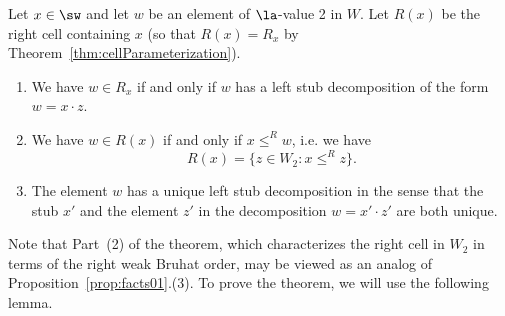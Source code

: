 \begin{thm}
    \label{thm:CellViaDecomp}
    Let $x\in \sw$ and let $w$ be an element of $\la$-value 2 in $W$. Let $R(x)$ be the right cell containing $x$
    \textup{(}so that $R(x)=R_x$ by Theorem~\ref{thm:cellParameterization}\textup{)}.
    \begin{enumerate}
        \item We have  $w\in R_x$ if and only if $w$ has a left stub decomposition of the form $w=x\cdot z$.
        \item We have $w\in R(x)$ if and only if $x\le^R w$, i.e. we have 
        \[
            R(x)=\{z\in W_2: x\le^R z\}.
        \]
        \item The element $w$ has a unique left stub decomposition in the sense that the stub $x'$ and the
             element  $z'$ in the decomposition $w=x'\cdot z'$ are both unique.
    \end{enumerate}
\end{thm}

\noindent
Note that Part~(2) of the theorem, which characterizes the right cell in $W_2$ in terms of the right
weak Bruhat order, may be viewed as an analog of Proposition~\ref{prop:facts01}.(3). To prove the theorem, we
will use the following lemma. 

